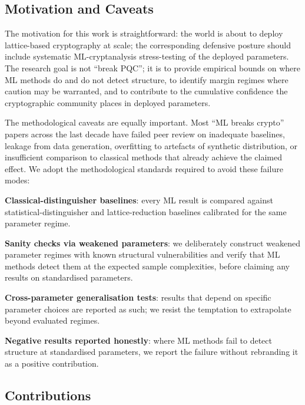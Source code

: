 \documentclass[sigconf,nonacm]{acmart}
\begin{document}
\subsection{Motivation and Caveats}

The motivation for this work is straightforward: the world is about to
deploy lattice-based cryptography at scale; the corresponding
defensive posture should include systematic ML-cryptanalysis
stress-testing of the deployed parameters. The research goal is not
``break PQC''; it is to provide empirical bounds on where ML methods
do and do not detect structure, to identify margin regimes where
caution may be warranted, and to contribute to the cumulative confidence
the cryptographic community places in deployed parameters.

The methodological caveats are equally important. Most ``ML breaks
crypto'' papers across the last decade have failed peer review on
inadequate baselines, leakage from data generation, overfitting to
artefacts of synthetic distribution, or insufficient comparison to
classical methods that already achieve the claimed effect. We adopt
the methodological standards required to avoid these failure modes:

\textbf{Classical-distinguisher baselines}: every ML result is compared
against statistical-distinguisher and lattice-reduction baselines
calibrated for the same parameter regime.

\textbf{Sanity checks via weakened parameters}: we deliberately
construct weakened parameter regimes with known structural
vulnerabilities and verify that ML methods detect them at the
expected sample complexities, before claiming any results on
standardised parameters.

\textbf{Cross-parameter generalisation tests}: results that depend on
specific parameter choices are reported as such; we resist the
temptation to extrapolate beyond evaluated regimes.

\textbf{Negative results reported honestly}: where ML methods fail to
detect structure at standardised parameters, we report the failure
without rebranding it as a positive contribution.

\subsection{Contributions}
\end{document}
